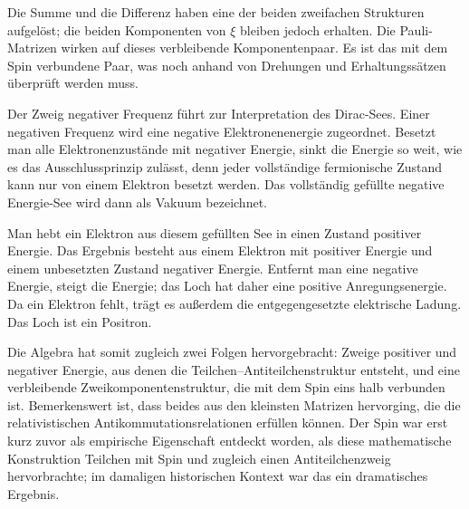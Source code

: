 Die Summe und die Differenz haben eine der beiden zweifachen Strukturen aufgelöst; die beiden Komponenten von \(\xi\) bleiben jedoch erhalten. Die Pauli-Matrizen wirken auf dieses verbleibende Komponentenpaar. Es ist das mit dem Spin verbundene Paar, was noch anhand von Drehungen und Erhaltungssätzen überprüft werden muss.

\begin{classroomqa}
\end{classroomqa}

Der Zweig negativer Frequenz führt zur Interpretation des Dirac-Sees. Einer negativen Frequenz wird eine negative Elektronenenergie zugeordnet. Besetzt man alle Elektronenzustände mit negativer Energie, sinkt die Energie so weit, wie es das Ausschlussprinzip zulässt, denn jeder vollständige fermionische Zustand kann nur von einem Elektron besetzt werden. Das vollständig gefüllte negative Energie-See wird dann als Vakuum bezeichnet.

Man hebt ein Elektron aus diesem gefüllten See in einen Zustand positiver Energie. Das Ergebnis besteht aus einem Elektron mit positiver Energie und einem unbesetzten Zustand negativer Energie. Entfernt man eine negative Energie, steigt die Energie; das Loch hat daher eine positive Anregungsenergie. Da ein Elektron fehlt, trägt es außerdem die entgegengesetzte elektrische Ladung. Das Loch ist ein Positron.

\begin{classroomqa}
\end{classroomqa}

Die Algebra hat somit zugleich zwei Folgen hervorgebracht: Zweige positiver und negativer Energie, aus denen die Teilchen--Antiteilchenstruktur entsteht, und eine verbleibende Zweikomponentenstruktur, die mit dem Spin eins halb verbunden ist. Bemerkenswert ist, dass beides aus den kleinsten Matrizen hervorging, die die relativistischen Antikommutationsrelationen erfüllen können. Der Spin war erst kurz zuvor als empirische Eigenschaft entdeckt worden, als diese mathematische Konstruktion Teilchen mit Spin und zugleich einen Antiteilchenzweig hervorbrachte; im damaligen historischen Kontext war das ein dramatisches Ergebnis.


